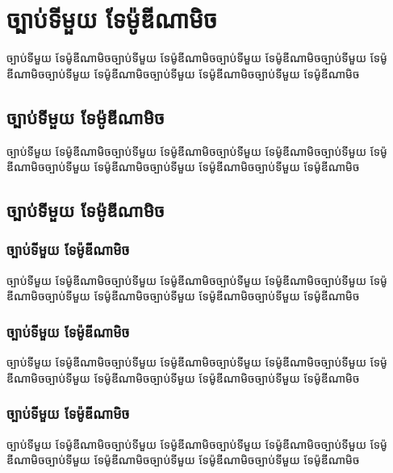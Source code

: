 \documentclass[11pt,a5paper]{classes/fancy}
\begin{document}
    \chapter{ច្បាប់ទីមួយ ទែម៉ូឌីណាមិច}
    \begin{introduction}
    	ច្បាប់ទីមួយ ទែម៉ូឌីណាមិចច្បាប់ទីមួយ ទែម៉ូឌីណាមិចច្បាប់ទីមួយ ទែម៉ូឌីណាមិចច្បាប់ទីមួយ ទែម៉ូឌីណាមិចច្បាប់ទីមួយ ទែម៉ូឌីណាមិចច្បាប់ទីមួយ ទែម៉ូឌីណាមិចច្បាប់ទីមួយ ទែម៉ូឌីណាមិច
    \end{introduction}
    \section{ច្បាប់ទីមួយ ទែម៉ូឌីណាមិច}
    \begin{example}
        ច្បាប់ទីមួយ ទែម៉ូឌីណាមិចច្បាប់ទីមួយ ទែម៉ូឌីណាមិចច្បាប់ទីមួយ ទែម៉ូឌីណាមិចច្បាប់ទីមួយ ទែម៉ូឌីណាមិចច្បាប់ទីមួយ ទែម៉ូឌីណាមិចច្បាប់ទីមួយ ទែម៉ូឌីណាមិចច្បាប់ទីមួយ ទែម៉ូឌីណាមិច
    \end{example}
    \section{ច្បាប់ទីមួយ ទែម៉ូឌីណាមិច}
    \subsection{ច្បាប់ទីមួយ ទែម៉ូឌីណាមិច}
    \begin{remark}
        ច្បាប់ទីមួយ ទែម៉ូឌីណាមិចច្បាប់ទីមួយ ទែម៉ូឌីណាមិចច្បាប់ទីមួយ ទែម៉ូឌីណាមិចច្បាប់ទីមួយ ទែម៉ូឌីណាមិចច្បាប់ទីមួយ ទែម៉ូឌីណាមិចច្បាប់ទីមួយ ទែម៉ូឌីណាមិចច្បាប់ទីមួយ ទែម៉ូឌីណាមិច
    \end{remark}
    \subsection{ច្បាប់ទីមួយ ទែម៉ូឌីណាមិច}
    \begin{definition}
        ច្បាប់ទីមួយ ទែម៉ូឌីណាមិចច្បាប់ទីមួយ ទែម៉ូឌីណាមិចច្បាប់ទីមួយ ទែម៉ូឌីណាមិចច្បាប់ទីមួយ ទែម៉ូឌីណាមិចច្បាប់ទីមួយ ទែម៉ូឌីណាមិចច្បាប់ទីមួយ ទែម៉ូឌីណាមិចច្បាប់ទីមួយ ទែម៉ូឌីណាមិច
    \end{definition}
    \subsection{ច្បាប់ទីមួយ ទែម៉ូឌីណាមិច}
    \begin{theorem}
        ច្បាប់ទីមួយ ទែម៉ូឌីណាមិចច្បាប់ទីមួយ ទែម៉ូឌីណាមិចច្បាប់ទីមួយ ទែម៉ូឌីណាមិចច្បាប់ទីមួយ ទែម៉ូឌីណាមិចច្បាប់ទីមួយ ទែម៉ូឌីណាមិចច្បាប់ទីមួយ ទែម៉ូឌីណាមិចច្បាប់ទីមួយ ទែម៉ូឌីណាមិច
    \end{theorem}
\end{document}
